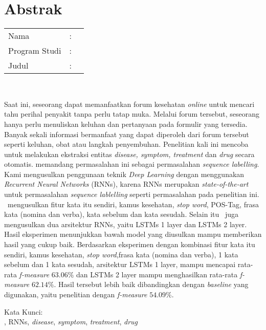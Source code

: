%
%
%

\chapter*{Abstrak}

\vspace*{0.2cm}

\noindent \begin{tabular}{l l p{10cm}}
	Nama&: & \penulis \\
	Program Studi&: & \program \\
	Judul&: & \judul \\
\end{tabular} \\ 

\vspace*{0.5cm}

\noindent
Saat ini, seseorang dapat memanfaatkan forum kesehatan \textit{online} untuk mencari tahu perihal penyakit tanpa perlu tatap muka.  Melalui forum tersebut, seseorang hanya perlu menuliskan keluhan dan pertanyaan pada formulir yang tersedia. Banyak sekali informasi bermanfaat yang dapat diperoleh dari forum tersebut seperti keluhan, obat atau langkah penyembuhan. Penelitian kali ini mencoba untuk melakukan ekstraksi entitas \textit{disease, symptom, treatment} dan \textit{drug} secara otomatis. \Saya memandang permasalahan ini sebagai permasalahan \textit{sequence labelling}. Kami mengusulkan penggunaan teknik \textit{Deep Learning} dengan menggunakan \textit{Recurrent Neural Networks} (RNNs), karena RNNs merupakan \textit{state-of-the-art} untuk permasalahan \textit{sequence lablelling} seperti permasalahan pada penelitian ini. \Saya~mengusulkan fitur kata itu sendiri, kamus kesehatan, \textit{stop word}, POS-Tag, frasa kata (nomina dan verba), kata sebelum dan kata sesudah. Selain itu \saya~juga mengusulkan dua arsitektur RNNs, yaitu LSTMs 1 layer dan LSTMs 2 layer. Hasil eksperimen menunjukkan bawah model yang diusulkan mampu memberikan hasil yang cukup baik. Berdasarkan eksperimen dengan kombinasi fitur kata itu sendiri, kamus kesehatan, \textit{stop word},frasa kata (nomina dan verba), 1 kata sebelum dan 1 kata sesudah, arsitektur LSTMs 1 layer, mampu mencapai rata-rata \textit{f-measure} $ 63.06\% $ dan LSTMs 2 layer mampu menghasilkan rata-rata \textit{f-measure} $ 62.14\% $. Hasil tersebut lebih baik dibandingkan dengan \textit{baseline} yang digunakan, yaitu penelitian \cite{skripsiKakRadit} dengan \textit{f-measure} $ 54.09\% $.


\vspace*{0.2cm}

\noindent Kata Kunci: \\ 
\noindent \mer, RNNs, \textit{disease}, \textit{symptom}, \textit{treatment}, \textit{drug} \\ 

\newpage